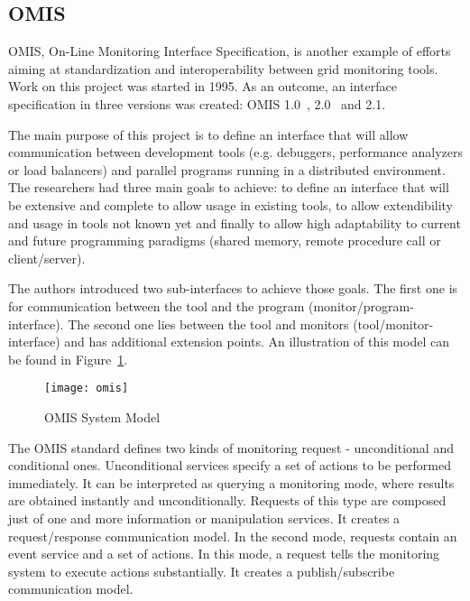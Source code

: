 
\subsection{OMIS}

\label{ssec:omis}

OMIS, On-Line Monitoring Interface Specification, is another example of efforts aiming at standardization and interoperability between grid monitoring tools. Work on this project was started in 1995. As an outcome, an interface specification in three versions was created: OMIS 1.0~\cite{OMIS1}, 2.0~\cite{OMIS2} and 2.1.

The main purpose of this project is to define an interface that will allow communication between development tools (e.g. debuggers, performance analyzers or load balancers) and parallel programs running in a distributed environment. The researchers had three main goals to achieve: to define an interface that will be extensive and complete to allow usage in existing tools, to allow extendibility and usage in tools not known yet and finally to allow high adaptability to current and future programming paradigms (shared memory, remote procedure call or client/server).

The authors introduced two sub-interfaces to achieve those goals. The first one is for communication between the tool and the program (monitor/program-interface). The second one lies between the tool and monitors (tool/monitor-interface) and has additional extension points. An illustration of this model can be found in Figure~\ref{fig:omis}.

\begin{figure}[ht]

\centering

\texttt{[image: omis]} \caption{OMIS System Model} \label{fig:omis}

\end{figure}

The OMIS standard defines two kinds of monitoring request - unconditional and conditional ones. Unconditional services specify a set of actions to be performed immediately. It can be interpreted as querying a monitoring mode, where results are obtained instantly and unconditionally. Requests of this type are composed just of one and more information or manipulation services. It creates a request/response communication model. In the second mode, requests contain an event service and a set of actions. In this mode, a request tells the monitoring system to execute actions substantially. It creates a publish/subscribe communication model.

